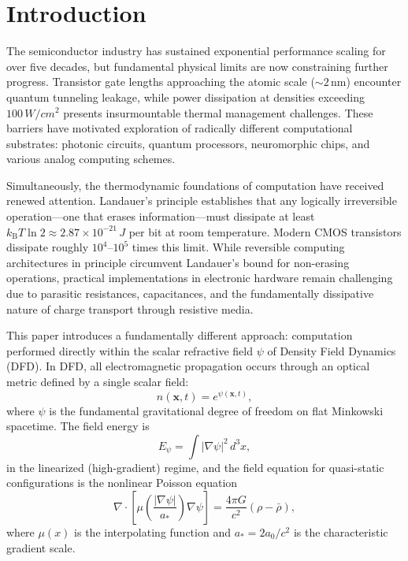 \documentclass[12pt,a4paper,twoside]{article}
\newcommand{\DFD}{DFD}
\newcommand{\kB}{k_{\mathrm{B}}}
\begin{document}
\vspace{1em}

\tableofcontents
\newpage

\section{Introduction}\label{sec:intro}

The semiconductor industry has sustained exponential performance scaling for over five decades, but fundamental physical limits are now constraining further progress. Transistor gate lengths approaching the atomic scale (${\sim}2$\,nm) encounter quantum tunneling leakage, while power dissipation at densities exceeding $100\,\si{W/cm^2}$ presents insurmountable thermal management challenges. These barriers have motivated exploration of radically different computational substrates: photonic circuits, quantum processors, neuromorphic chips, and various analog computing schemes.

Simultaneously, the thermodynamic foundations of computation have received renewed attention. Landauer's principle establishes that any logically irreversible operation---one that erases information---must dissipate at least $\kB T \ln 2 \approx 2.87 \times 10^{-21}\,\si{J}$ per bit at room temperature. Modern CMOS transistors dissipate roughly $10^4$--$10^5$ times this limit. While reversible computing architectures in principle circumvent Landauer's bound for non-erasing operations, practical implementations in electronic hardware remain challenging due to parasitic resistances, capacitances, and the fundamentally dissipative nature of charge transport through resistive media.

This paper introduces a fundamentally different approach: computation performed directly within the scalar refractive field $\psi$ of Density Field Dynamics (\DFD). In \DFD{}, all electromagnetic propagation occurs through an optical metric defined by a single scalar field:
\begin{equation}
n(\mathbf{x},t) = e^{\psi(\mathbf{x},t)},
\label{eq:refindex}
\end{equation}
where $\psi$ is the fundamental gravitational degree of freedom on flat Minkowski spacetime. The field energy is
\begin{equation}
E_\psi = \int |\nabla\psi|^2\,d^3x,
\label{eq:field_energy}
\end{equation}
in the linearized (high-gradient) regime, and the field equation for quasi-static configurations is the nonlinear Poisson equation
\begin{equation}
\nabla \cdot \left[\mu\!\left(\frac{|\nabla\psi|}{a_*}\right)\nabla\psi\right] = \frac{4\pi G}{c^2}(\rho - \bar{\rho}),
\label{eq:field_eq}
\end{equation}
where $\mu(x)$ is the interpolating function and $a_* = 2a_0/c^2$ is the characteristic gradient scale.
\end{document}
